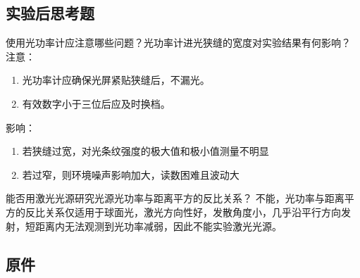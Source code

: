 \documentclass[dvipsnames, svgnames,a4paper,11pt]{article}
\begin{document}
\subsection{实验后思考题}
\begin{question}
	使用光功率计应注意哪些问题？光功率计进光狭缝的宽度对实验结果有何影响？
	\tcblower
	注意：\begin{enumerate}
		\item 光功率计应确保光屏紧贴狭缝后，不漏光。
		\item 有效数字小于三位后应及时换档。
	\end{enumerate}
	影响：\begin{enumerate}
		\item 若狭缝过宽，对光条纹强度的极大值和极小值测量不明显
		\item 若过窄，则环境噪声影响加大，读数困难且波动大
	\end{enumerate}
\end{question}

\begin{question}
	能否用激光光源研究光源光功率与距离平方的反比关系？
	\tcblower
	不能，光功率与距离平方的反比关系仅适用于球面光，激光方向性好，发散角度小，几乎沿平行方向发射，短距离内无法观测到光功率减弱，因此不能实验激光光源。
\end{question}
\clearpage
%
%


\appendix
\appendixpage
\addappheadtotoc
%
\subsection*{原件}
%
\end{document}
